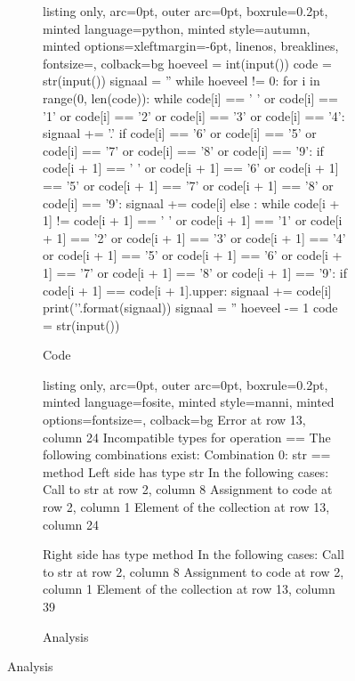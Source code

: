 \begin{figure}[h]
\caption{Submision 3}
\label{sbm:sub3}
  \begin{subfigure}{\textwidth}
        \caption{Code}
        \label{sbm:sub3_code}

  \begin{tcblisting}{listing only, 
    arc=0pt,
    outer arc=0pt, 
    boxrule=0.2pt,
    minted language=python,
    minted style=autumn,
    minted options={xleftmargin=-6pt, linenos, breaklines, fontsize=\small},
    colback=bg }
hoeveel = int(input())
code = str(input())
signaal = ''
while hoeveel != 0:
    for i in range(0, len(code)):
        while code[i] == ' ' or code[i] == '1' or code[i] == '2' or code[i] == '3' or code[i] == '4':
            signaal += '.'
        if code[i] == '6' or code[i] == '5' or code[i] == '7' or code[i] == '8' or code[i] == '9':
            if code[i + 1] == ' ' or code[i + 1] == '6' or code[i + 1] == '5' or code[i + 1] == '7' or code[i + 1] == '8' or code[i] == '9':
                signaal += code[i]
            else :
                while code[i + 1] != code[i + 1] == ' ' or code[i + 1] == '1' or code[i + 1] == '2' or code[i + 1] == '3' or code[i + 1] == '4' or code[i + 1] == '5' or code[i + 1] == '6' or code[i + 1] == '7' or code[i + 1] == '8' or code[i + 1] == '9':
                    if code[i + 1] == code[i + 1].upper:
                        signaal += code[i]
    print('{}'.format(signaal))
    signaal = ''
    hoeveel -= 1
    code = str(input())
\end{tcblisting}
\end{subfigure}
\begin{subfigure}{\textwidth}
        \caption{Analysis}
        \label{sbm:sub3_anal}
\begin{tcblisting}{listing only, 
    arc=0pt,
    outer arc=0pt, 
    boxrule=0.2pt,
    minted language=fosite,
    minted style=manni,
    minted options={fontsize=\small},
    colback=bg }
Error at row 13, column 24
  Incompatible types for operation ==
  The following combinations exist:
  Combination 0: str == method
    Left side has type str
    In the following cases:
      Call to str at row 2, column 8
      Assignment to code at row 2, column 1
      Element of the collection at row 13, column 24

    Right side has type method
    In the following cases:
      Call to str at row 2, column 8
      Assignment to code at row 2, column 1
      Element of the collection at row 13, column 39
\end{tcblisting}
\end{subfigure}
\end{figure}
